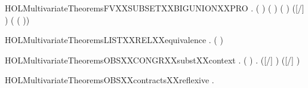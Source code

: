 \newcommand{\HOLMultivariateTheoremsFVXXSUBSETXXBIGUNION}{\UseVerbatim{HOLMultivariateTheoremsFVXXSUBSETXXBIGUNION}}
\begin{SaveVerbatim}{HOLMultivariateTheoremsFVXXSUBSETXXBIGUNIONXXPRO}
\HOLTokenTurnstile{} \HOLSymConst{\HOLTokenForall{}}  .
         \HOLSymConst{\HOLTokenConj{}} (  \HOLSymConst{=}  ) \HOLSymConst{\HOLTokenConj{}}
        ( ) ( ) \HOLSymConst{\HOLTokenImp{}}
        ([/] ) \HOLConst{\HOLTokenSubset{}}
            \HOLConst{\HOLTokenUnion{}}  (  ( ))
\end{SaveVerbatim}
\newcommand{\HOLMultivariateTheoremsFVXXSUBSETXXBIGUNIONXXPRO}{\UseVerbatim{HOLMultivariateTheoremsFVXXSUBSETXXBIGUNIONXXPRO}}
\begin{SaveVerbatim}{HOLMultivariateTheoremsLISTXXRELXXequivalence}
\HOLTokenTurnstile{} \HOLSymConst{\HOLTokenForall{}}.   \HOLSymConst{\HOLTokenImp{}}  ( )
\end{SaveVerbatim}
\newcommand{\HOLMultivariateTheoremsLISTXXRELXXequivalence}{\UseVerbatim{HOLMultivariateTheoremsLISTXXRELXXequivalence}}
\begin{SaveVerbatim}{HOLMultivariateTheoremsOBSXXCONGRXXsubstXXcontext}
\HOLTokenTurnstile{} \HOLSymConst{\HOLTokenForall{}}  .
         \HOLSymConst{\HOLTokenConj{}} (  \HOLSymConst{=}  ) \HOLSymConst{\HOLTokenConj{}}
          \HOLSymConst{\HOLTokenImp{}}
       \HOLSymConst{\HOLTokenForall{}}.    \HOLSymConst{\HOLTokenImp{}}  ([/] ) ([/] )
\end{SaveVerbatim}
\newcommand{\HOLMultivariateTheoremsOBSXXCONGRXXsubstXXcontext}{\UseVerbatim{HOLMultivariateTheoremsOBSXXCONGRXXsubstXXcontext}}
\begin{SaveVerbatim}{HOLMultivariateTheoremsOBSXXcontractsXXreflexive}
\HOLTokenTurnstile{} \HOLSymConst{\HOLTokenForall{}}.   
\end{SaveVerbatim}
